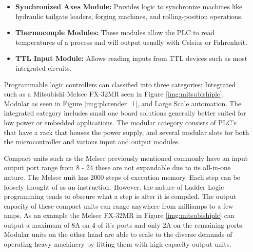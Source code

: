 \begin{itemize}
	\item \textbf{Synchronized Axes Module:} Provides logic to synchronize machines like hydraulic tailgate loaders, forging machines, and rolling-position operations.
	\item \textbf{Thermocouple Modules:} These modules allow the PLC to read temperatures of a process and will output usually with Celsius or Fahrenheit.
	\item \textbf{TTL Input Module:} Allows reading inputs from TTL devices such as most integrated circuits.
\end{itemize}

Programmable logic controllers can classified into three categories: Integrated such 
as a Mitsubishi Melsec FX-32MR seen in Figure \ref{img:mitsubishiplc}, Modular as seen 
in Figure \ref{img:plcrender_1}, and Large Scale automation. The integrated category 
includes small one board solutions generally better suited for low power or embedded 
applications. The modular category consists of PLC's that have a rack that houses the 
power supply, and several modular slots for both the microcontroller and various input 
and output modules.

Compact units such as the Melsec previously mentioned commonly have an input output 
port range from 8 - 24 these are not expandable due to its all-in-one nature. 
The Melsec unit has 2000 steps of execution memory. Each step can be loosely thought 
of as an instruction. However, the nature of Ladder Logic programming tends to obscure 
what a step is after it is compiled. The output capacity of these compact units can range 
anywhere from milliamps to a few amps. As an example the Melsec FX-32MR in 
Figure \ref{img:mitsubishiplc} can output a maximum of 8A on 4 of it's ports and only 
2A on the remaining ports. Modular units on the other hand are able to scale to the 
diverse demands of operating heavy machinery by fitting them with high capacity output units.

